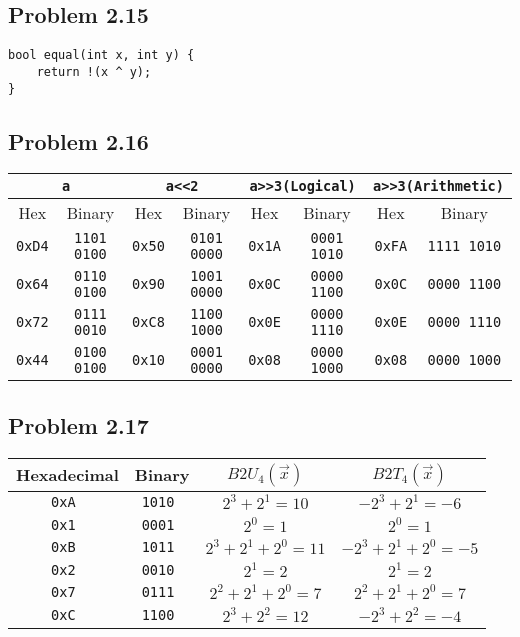 \documentclass[a4paper]{article}
\begin{document}
\subsection*{Problem 2.15}
\begin{lstlisting}
bool equal(int x, int y) {
    return !(x ^ y);
}
\end{lstlisting}

\subsection*{Problem 2.16}
\begin{tabular}{cc|cc|cc|cc}
    \multicolumn{2}{c|}{\tt{a}}&\multicolumn{2}{|c|}{\tt{a<<2}}&\multicolumn{2}{|c|}{\tt{a>>3}(Logical)}&\multicolumn{2}{|c}{\tt{a>>3}(Arithmetic)}\\
    \hline
    Hex&Binary&Hex&Binary&Hex&Binary&Hex&Binary\\
    \hline
    \tt{0xD4}&\tt{1101 0100}&\tt{0x50}&\tt{0101 0000}&\tt{0x1A}&\tt{0001 1010}&\tt{0xFA}&\tt{1111 1010}\\
    \tt{0x64}&\tt{0110 0100}&\tt{0x90}&\tt{1001 0000}&\tt{0x0C}&\tt{0000 1100}&\tt{0x0C}&\tt{0000 1100}\\
    \tt{0x72}&\tt{0111 0010}&\tt{0xC8}&\tt{1100 1000}&\tt{0x0E}&\tt{0000 1110}&\tt{0x0E}&\tt{0000 1110}\\
    \tt{0x44}&\tt{0100 0100}&\tt{0x10}&\tt{0001 0000}&\tt{0x08}&\tt{0000 1000}&\tt{0x08}&\tt{0000 1000}
\end{tabular}

\subsection*{Problem 2.17}
\begin{tabular}{c|c|c|c}
    Hexadecimal &Binary     &$B2U_4(\vec{x})$   &$B2T_4(\vec{x})$\\
    \hline
    \tt{0xA}    &\tt{1010}  &$2^3+2^1=10$       &$-2^3+2^1=-6$\\
    \tt{0x1}    &\tt{0001}  &$2^0=1$            &$2^0=1$\\
    \tt{0xB}    &\tt{1011}  &$2^3+2^1+2^0=11$   &$-2^3+2^1+2^0=-5$\\
    \tt{0x2}    &\tt{0010}  &$2^1=2$            &$2^1=2$\\
    \tt{0x7}    &\tt{0111}  &$2^2+2^1+2^0=7$    &$2^2+2^1+2^0=7$\\
    \tt{0xC}    &\tt{1100}  &$2^3+2^2=12$       &$-2^3+2^2=-4$
\end{tabular}
\end{document}

